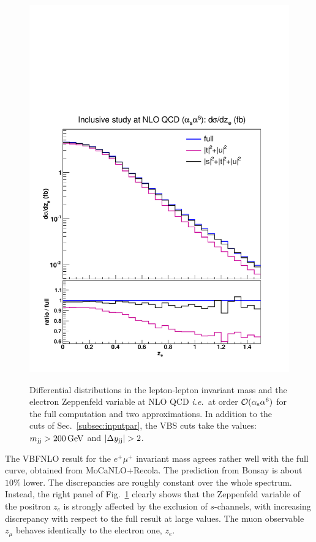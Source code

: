 \begin{figure}[hbt]
{\includegraphics[scale=0.35]{figures/scanfigures/zel_nlo.pdf}}
\caption{Differential distributions in the lepton-lepton invariant mass and the electron Zeppenfeld variable at NLO QCD \emph{i.e.}\ at order $\mathcal{O}(\alpha_\text{s}\alpha^6)$ for the full computation and two approximations.
In addition to the cuts of Sec.~\ref{subsec:inputpar}, the VBS cuts take the values: $m_{\text{j}\text{j}}>200 \,\text{GeV}$ and $|\Delta y_{\Pj\Pj}|>2$.} 
\label{fig:mjjdyjj_1d_3}
\end{figure}
%
The {\sc VBFNLO} result for the $e^+\mu^+$ invariant mass agrees rather well with the full curve, obtained from {\sc MoCaNLO+Recola}.
The prediction from {\sc Bonsay} is about $10\%$ lower.
The discrepancies are roughly constant over the whole spectrum.
Instead, the right panel of Fig.~\ref{fig:mjjdyjj_1d_3} clearly shows that the Zeppenfeld variable of the positron $z_e$ is strongly affected by the exclusion of $s$-channels, with increasing discrepancy with respect to the full result at large values.
The muon observable $z_{\mu}$ behaves identically to the electron one, $z_e$.

